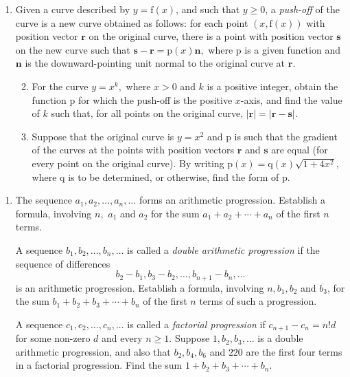 \documentclass[a4, 11pt]{report}
\newlength{\qspace}
\newcounter{qnumber}
\newenvironment{question}%
 {\vspace{\qspace}
  \begin{enumerate}[\bfseries 1\quad][10]%
    \setcounter{enumi}{\value{qnumber}}%
    \item%
 }
{
  \end{enumerate}
  \filbreak
  \stepcounter{qnumber}
 }
\newenvironment{questionparts}[1][1]%
 {
  \begin{enumerate}[\bfseries (i)]%
    \setcounter{enumii}{#1}
    \addtocounter{enumii}{-1}
    \setlength{\itemsep}{5mm}
    \setlength{\parskip}{8pt}
 }
 {
  \end{enumerate}
 }
\begin{document}
\begin{question}
Given a curve described by $y=\mathrm{f}(x)$, and such that $y\geqslant0$,
a \textit{push-off }of the curve is a new curve obtained as follows:
for each point $(x,\mathrm{f}(x))$ with position vector $\mathbf{r}$
on the original curve, there is a point with position vector $\mathbf{s}$
on the new curve such that $\mathbf{s-r}=\mathrm{p}(x)\mathbf{n},$
where $\mathrm{p}$ is a given function and $\mathbf{n}$ is the downward-pointing
unit normal to the original curve at $\mathbf{r}$. 

\begin{questionparts}
\item For the curve $y=x^{k},$ where $x>0$ and $k$ is a positive integer,
obtain the function $\mathrm{p}$ for which the push-off is the positive
$x$-axis, and find the value of $k$ such that, for all points on
the original curve, $\left|\mathbf{r}\right|=\left|\mathbf{r-s}\right|$. 
\item Suppose that the original curve is $y=x^{2}$ and $\mathrm{p}$ is such
that the gradient of the curves at the points with position vectors
$\mathbf{r}$ and $\mathbf{s}$ are equal (for every point on the
original curve). By writing $\mathrm{p}(x)=\mathrm{q}(x)\sqrt{1+4x^{2}},$
where $\mathrm{q}$ is to be determined, or otherwise, find the form
of $\mathrm{p}$.
\end{questionparts}
\end{question}



\begin{question}
The sequence $a_{1},a_{2},\ldots,a_{n},\ldots$ forms an arithmetic
progression. Establish a formula, involving $n,$ $a_{1}$ and $a_{2}$
for the sum $a_{1}+a_{2}+\cdots+a_{n}$ of the first $n$ terms. 


A sequence $b_{1},b_{2},\ldots,b_{n},\ldots$ is called a \textit{double
arithmetic progression} if the sequence of differences
\[
b_{2}-b_{1},b_{3}-b_{2},\ldots,b_{n+1}-b_{n},\ldots
\]
is an arithmetic progression. Establish a formula, involving $n,b_{1},b_{2}$
and $b_{3}$, for the sum $b_{1}+b_{2}+b_{3}+\cdots+b_{n}$ of the
first $n$ terms of such a progression. 


A sequence $c_{1},c_{2},\ldots,c_{n},\ldots$ is called a \textit{factorial
progression} if $c_{n+1}-c_{n}=n!d$ for some non-zero $d$ and every
$n\geqslant1$. Suppose $1,b_{2},b_{3},\ldots$ is a double arithmetic
progression, and also that $b_{2},b_{4},b_{6}$ and $220$ are the first
four terms in a factorial progression. Find the sum $1+b_{2}+b_{3}+\cdots+b_{n}.$
\end{question}
\end{document}
